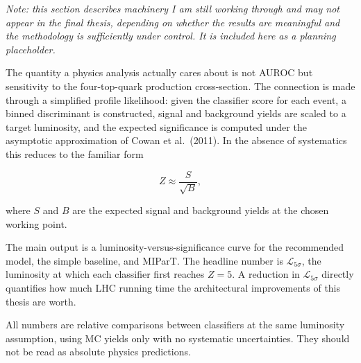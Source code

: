 \textit{Note: this section describes machinery I am still working
through and may not appear in the final thesis, depending on whether
the results are meaningful and the methodology is sufficiently under
control. It is included here as a planning placeholder.}

The quantity a physics analysis actually cares about is not AUROC but
sensitivity to the four-top-quark production cross-section. The
connection is made through a simplified profile likelihood: given the
classifier score for each event, a binned discriminant is constructed,
signal and background yields are scaled to a target luminosity, and
the expected significance is computed under the asymptotic
approximation of Cowan et al.\ (2011). In the absence of systematics
this reduces to the familiar form

\begin{equation}
Z \approx \frac{S}{\sqrt{B}},
\end{equation}

where $S$ and $B$ are the expected signal and background yields at
the chosen working point.

The main output is a luminosity-versus-significance curve for the
recommended model, the simple baseline, and MIParT. The headline
number is $\mathcal{L}_{5\sigma}$, the luminosity at which each
classifier first reaches $Z = 5$. A reduction in $\mathcal{L}_{5\sigma}$
directly quantifies how much LHC running time the architectural
improvements of this thesis are worth.

All numbers are relative comparisons between classifiers at the same
luminosity assumption, using MC yields only with no systematic
uncertainties. They should not be read as absolute physics predictions.
